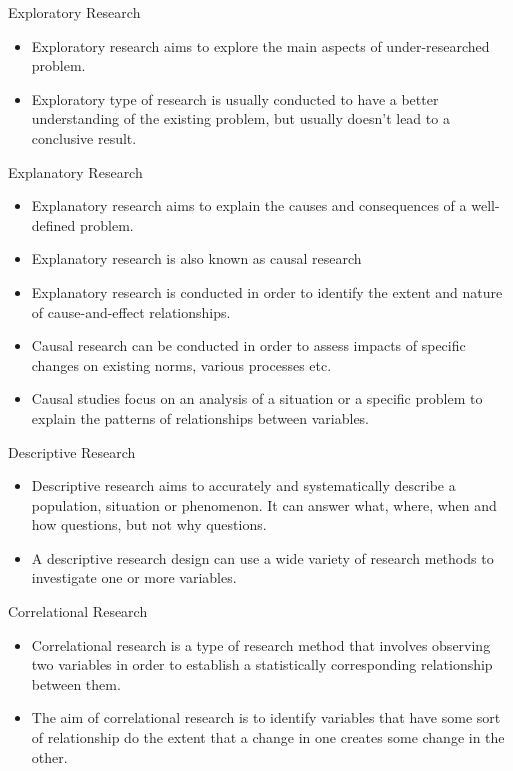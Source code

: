\begin{frame}[t]{Exploratory Research}
	\begin{itemize}
		\item Exploratory research aims to explore the main aspects of 
		under-researched problem.
		\item Exploratory type of research is usually conducted to have a 
		better understanding of the existing problem, but usually doesn't lead 
		to a conclusive result. 
	\end{itemize}
\end{frame}


\begin{frame}[t]{Explanatory Research}
	\begin{itemize}
		\item Explanatory research aims to explain the causes and consequences 
		of a well-defined problem.
		\item Explanatory research is also known as causal research 
		\item Explanatory research is conducted in order to identify the extent 
		and nature of cause-and-effect relationships.
		\item  Causal research can be conducted in order to assess impacts of 
		specific changes on existing norms, various processes etc.
		\item Causal studies focus on an analysis of a situation or a specific 
		problem to explain the patterns of relationships between variables. 
	\end{itemize}
\end{frame}



\begin{frame}[t]{Descriptive Research}
	\begin{itemize}
		\item Descriptive research aims to accurately and systematically 
		describe a population, situation or phenomenon. It can answer what, 
		where, when and how questions, but not why questions.
		\item A descriptive research design can use a wide variety of research 
		methods to investigate one or more variables. 
	\end{itemize}
\end{frame}


\begin{frame}[t]{Correlational Research}
	\begin{itemize}
		\item Correlational research is a type of research method that involves 
		observing two variables in order to establish a statistically 
		corresponding relationship between them.
		\item The aim of correlational research is to identify variables that 
		have some sort of relationship do the extent that a change in one 
		creates some change in the other. 
	\end{itemize}
\end{frame}


